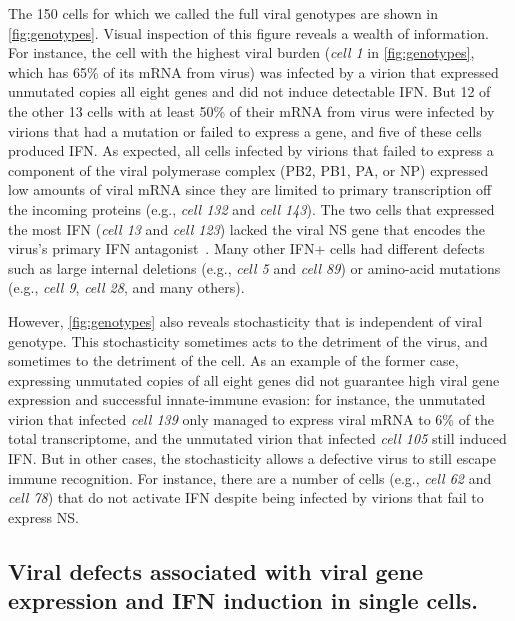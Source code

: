 \documentclass[lineno]{asm-article}
\newcommand{\FIG}[1]{\autoref{fig:#1}}
\begin{document}
The 150 cells for which we called the full viral genotypes are shown in \FIG{genotypes}.
Visual inspection of this figure reveals a wealth of information.
For instance, the cell with the highest viral burden (\textit{cell 1} in \FIG{genotypes}, which has 65\% of its mRNA from virus) was infected by a virion that expressed unmutated copies all eight genes and did not induce detectable IFN.
But 12 of the other 13 cells with at least 50\% of their mRNA from virus were infected by virions that had a mutation or failed to express a gene, and five of these cells produced IFN.
As expected, all cells infected by virions that failed to express a component of the viral polymerase complex (PB2, PB1, PA, or NP) expressed low amounts of viral mRNA since they are limited to primary transcription off the incoming proteins (e.g., \textit{cell 132} and \textit{cell 143}).
The two cells that expressed the most IFN (\textit{cell 13} and \textit{cell 123}) lacked the viral NS gene that encodes the virus's primary IFN antagonist~\cite{garcia1998influenza, hale2008multifunctional}.
Many other IFN+ cells had different defects such as large internal deletions (e.g., \textit{cell 5} and \textit{cell 89}) or amino-acid mutations (e.g., \textit{cell 9}, \textit{cell 28}, and many others).

However, \FIG{genotypes} also reveals stochasticity that is independent of viral genotype.
This stochasticity sometimes acts to the detriment of the virus, and sometimes to the detriment of the cell.
As an example of the former case, expressing unmutated copies of all eight genes did not guarantee high viral gene expression and successful innate-immune evasion: for instance, the unmutated virion that infected \textit{cell 139} only managed to express viral mRNA to 6\% of the total transcriptome, and the unmutated virion that infected \textit{cell 105} still induced IFN.
But in other cases, the stochasticity allows a defective virus to still escape immune recognition.
For instance, there are a number of cells (e.g., \textit{cell 62} and \textit{cell 78}) that do not activate IFN despite being infected by virions that fail to express NS.

\subsection{Viral defects associated with viral gene expression and IFN induction in single cells.}
\end{document}
